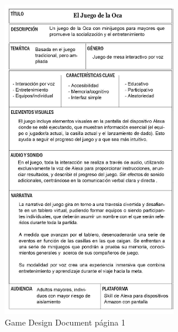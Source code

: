 \begin{figure}[H]
	\centering
	\includegraphics[width=0.68\textwidth]{imgs/GDD-1.jpg}
	\caption{Game Design Document página 1}
	\label{fig:GDD-1}
\end{figure}

